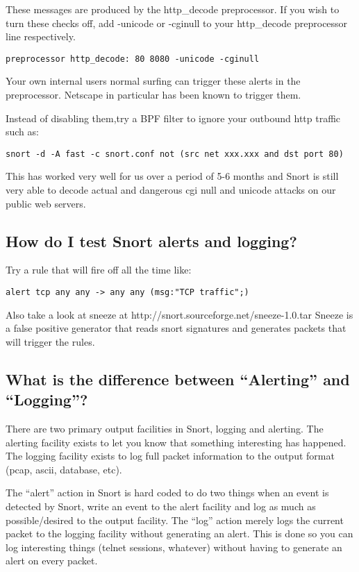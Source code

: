 \documentclass{article}
\begin{document}
These messages are produced by the http\_decode preprocessor.  If you wish
to turn these checks off, add -unicode or -cginull to your http\_decode
preprocessor line respectively.

\begin{verbatim}preprocessor http_decode: 80 8080 -unicode -cginull\end{verbatim}

Your own internal users normal surfing can trigger these alerts in the
preprocessor. Netscape in particular has been known to trigger them.

Instead of disabling them,try a BPF filter to ignore your outbound http
traffic such as:

\begin{verbatim}snort -d -A fast -c snort.conf not (src net xxx.xxx and dst port 80)\end{verbatim}

This has worked very well for us over a period of 5-6 months and Snort is
still very able to decode actual and dangerous cgi null and unicode attacks
on our public web servers.

\subsection{How do I test Snort alerts and logging?}

Try a rule that will fire off all the time like:

\begin{verbatim}alert tcp any any -> any any (msg:"TCP traffic";)\end{verbatim}
 
Also take a look at sneeze at http://snort.sourceforge.net/sneeze-1.0.tar
Sneeze is a false positive generator that reads snort signatures and generates
packets that will trigger the rules.

\subsection{What is the difference between ``Alerting'' and ``Logging''?}

There are two primary output facilities in Snort, logging and alerting. The
alerting facility exists to let you know that something interesting has
happened. The logging facility exists to log full packet information to the
output format (pcap, ascii, database, etc).

The ``alert'' action in Snort is hard coded to do two things when an event is
detected by Snort, write an event to the alert facility and log as much as
possible/desired to the output facility. The ``log'' action merely logs the
current packet to the logging facility without generating an alert. This is
done so you can log interesting things (telnet sessions, whatever) without
having to generate an alert on every packet.
\end{document}
